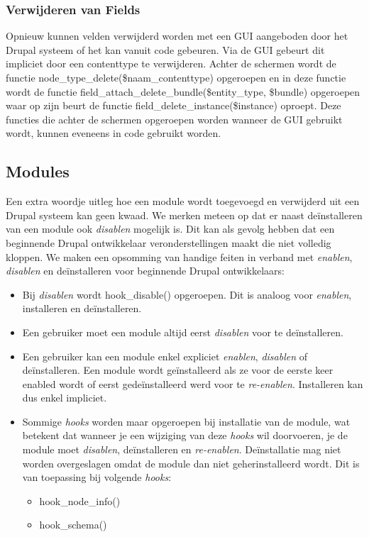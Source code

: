 \subsubsection{Verwijderen van Fields}
Opnieuw kunnen velden verwijderd worden met een GUI aangeboden door het Drupal systeem of het kan vanuit code gebeuren. Via de GUI gebeurt dit impliciet door een contenttype te verwijderen. Achter de schermen wordt de functie node\_type\_delete(\$naam\_contenttype) opgeroepen en in deze functie wordt de functie field\_attach\_delete\_bundle(\$entity\_type, \$bundle) opgeroepen waar op zijn beurt de functie field\_delete\_instance(\$instance) oproept. Deze functies die achter de schermen opgeroepen worden wanneer de GUI gebruikt wordt, kunnen eveneens in code gebruikt worden.
\newpage
\subsection{Modules}
Een extra woordje uitleg hoe een module wordt toegevoegd en verwijderd uit een Drupal systeem kan geen kwaad. We merken meteen op dat er naast de\"{i}nstalleren van een module ook \textit{disablen} mogelijk is. Dit kan als gevolg hebben dat een beginnende Drupal ontwikkelaar veronderstellingen maakt die niet volledig kloppen. We maken een opsomming van handige feiten in verband met \textit{enablen}, \textit{disablen} en de\"{i}nstalleren voor beginnende Drupal ontwikkelaars:
\begin{itemize}
\item Bij \textit{disablen} wordt hook\_disable() opgeroepen. Dit is analoog voor \textit{enablen}, installeren en de\"{i}nstalleren.
\item Een gebruiker moet een module altijd eerst \textit{disablen} voor te de\"{i}nstalleren.
\item Een gebruiker kan een module enkel expliciet \textit{enablen}, \textit{disablen} of de\"{i}nstalleren. Een module wordt ge\"{i}nstalleerd als ze voor de eerste keer enabled wordt of eerst gede\"{i}nstalleerd werd voor te \textit{re-enablen}. Installeren kan dus enkel impliciet.
\item Sommige \textit{hooks} worden maar opgeroepen bij installatie van de module, wat betekent dat wanneer je een wijziging van deze \textit{hooks} wil doorvoeren, je de module moet \textit{disablen}, de\"{i}nstalleren en \textit{re-enablen}. De\"{i}nstallatie mag niet worden overgeslagen omdat de module dan niet geherinstalleerd wordt. Dit is van toepassing bij volgende \textit{hooks}:
\begin{itemize}
\item hook\_node\_info()
\item hook\_schema()
\end{itemize}
\end{itemize}

